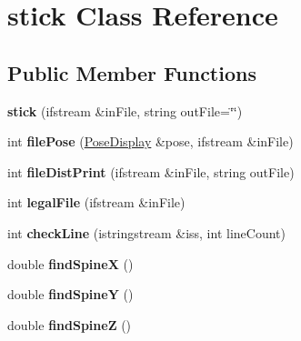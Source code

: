 \hypertarget{classstick}{}\section{stick Class Reference}
\label{classstick}
\subsection*{Public Member Functions}
\begin{DoxyCompactItemize}
\item 
\hypertarget{classstick_ab81ef6ce6a9bc9e2bf241c6a9441765c}{}{\bfseries stick} (ifstream \&in\+File, string out\+File=\char`\"{}\char`\"{})\label{classstick_ab81ef6ce6a9bc9e2bf241c6a9441765c}

\item 
\hypertarget{classstick_a97b59b9b03895515b05e14ad2be869c5}{}int {\bfseries file\+Pose} (\hyperlink{classPoseDisplay}{Pose\+Display} \&pose, ifstream \&in\+File)\label{classstick_a97b59b9b03895515b05e14ad2be869c5}

\item 
\hypertarget{classstick_ae435763b4a4fdf0de8e3ed033eeef29e}{}int {\bfseries file\+Dist\+Print} (ifstream \&in\+File, string out\+File)\label{classstick_ae435763b4a4fdf0de8e3ed033eeef29e}

\item 
\hypertarget{classstick_af866afb0e830eb0ca39dc6dc866767b6}{}int {\bfseries legal\+File} (ifstream \&in\+File)\label{classstick_af866afb0e830eb0ca39dc6dc866767b6}

\item 
\hypertarget{classstick_afd20aa5276207c3cd2a94dfd461d1e8d}{}int {\bfseries check\+Line} (istringstream \&iss, int line\+Count)\label{classstick_afd20aa5276207c3cd2a94dfd461d1e8d}

\item 
\hypertarget{classstick_a56b7f0096a26165c2de02caf85371103}{}double {\bfseries find\+Spine\+X} ()\label{classstick_a56b7f0096a26165c2de02caf85371103}

\item 
\hypertarget{classstick_ab74b62b1ec7cca23a7b8f94649b6a02a}{}double {\bfseries find\+Spine\+Y} ()\label{classstick_ab74b62b1ec7cca23a7b8f94649b6a02a}

\item 
\hypertarget{classstick_a3e7126377778ccd69a7131d31813c7b4}{}double {\bfseries find\+Spine\+Z} ()\label{classstick_a3e7126377778ccd69a7131d31813c7b4}


\end{DoxyCompactItemize}
